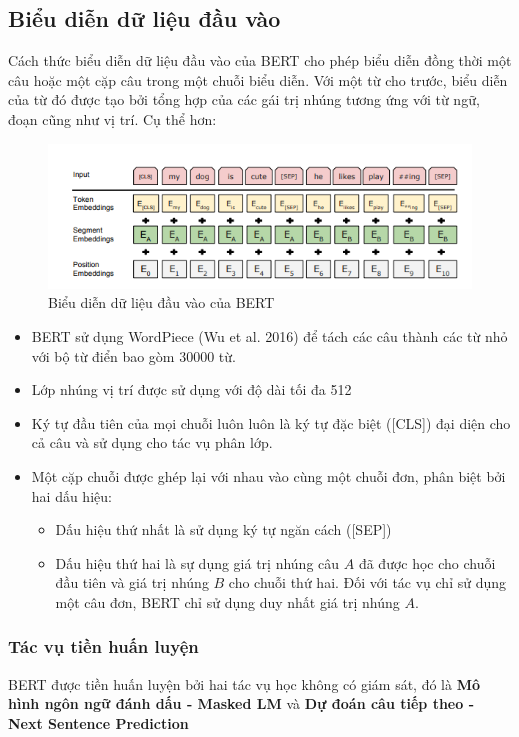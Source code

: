 \documentclass[14pt]{extreport}
\begin{document}
\subsection{Biểu diễn dữ liệu đầu vào}
Cách thức biểu diễn dữ liệu đầu vào của BERT cho phép biểu diễn đồng thời một câu hoặc một cặp câu trong một chuỗi biểu diễn. Với một từ cho trước, biểu diễn của từ đó được tạo bởi tổng hợp của các gái trị nhúng tương ứng với từ ngữ, đoạn cũng như vị trí. Cụ thể hơn:
\begin{figure}
    \centering
    \includegraphics{image/Bert_input.png}
    \caption{Biểu diễn dữ liệu đầu vào của BERT}
    \label{fig:input_bert}
\end{figure}
\begin{itemize}
    \item BERT sử dụng WordPiece (Wu et al. 2016) để tách các câu thành các từ nhỏ với bộ từ điển bao gòm 30000 từ.
    \item Lớp nhúng vị trí được sử dụng với độ dài tối đa 512
    \item Ký tự đầu tiên của mọi chuỗi luôn luôn là ký tự đặc biệt ([CLS]) đại diện cho cả câu và sử dụng cho tác vụ phân lớp.
    \item Một cặp chuỗi được ghép lại với nhau vào cùng một chuỗi đơn, phân biệt bởi hai dấu hiệu:
    \begin{itemize}
        \item Dấu hiệu thứ nhất là sử dụng ký tự ngăn cách ([SEP])
        \item Dấu hiệu thứ hai là sự dụng giá trị nhúng câu $A$ đã được học cho chuỗi đầu tiên và giá trị nhúng $B$ cho chuỗi thứ hai. Đối với tác vụ chỉ sử dụng một câu đơn, BERT chỉ sử dụng duy nhất giá trị nhúng $A$.
    \end{itemize}
\end{itemize}
\subsubsection{Tác vụ tiền huấn luyện}
BERT được tiền huấn luyện bởi hai tác vụ học không có giám sát, đó là \textbf{Mô hình ngôn ngữ đánh dấu - Masked LM} và \textbf{Dự đoán câu tiếp theo - Next Sentence Prediction}
\end{document}
